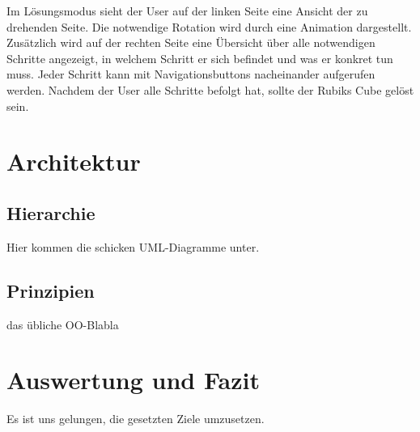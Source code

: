 Im Lösungsmodus sieht der User auf der linken Seite eine Ansicht der zu
drehenden Seite. Die notwendige Rotation wird durch eine Animation dargestellt.
Zusätzlich wird auf der rechten Seite eine Übersicht über alle notwendigen
Schritte angezeigt, in welchem Schritt er sich befindet und was er konkret tun
muss. Jeder Schritt kann mit Navigationsbuttons nacheinander aufgerufen werden.
Nachdem der User alle Schritte befolgt hat, sollte der Rubiks Cube gelöst sein.

\section{Architektur}  %

\subsection{Hierarchie}  %
Hier kommen die schicken UML-Diagramme unter.

\subsection{Prinzipien}  %
das übliche OO-Blabla

\section{Auswertung und Fazit}  %

Es ist uns gelungen, die gesetzten Ziele umzusetzen.




\appendix
\printbibliography[heading=bibintoc,title={Quellenverzeichnis}]
\listoffigures


